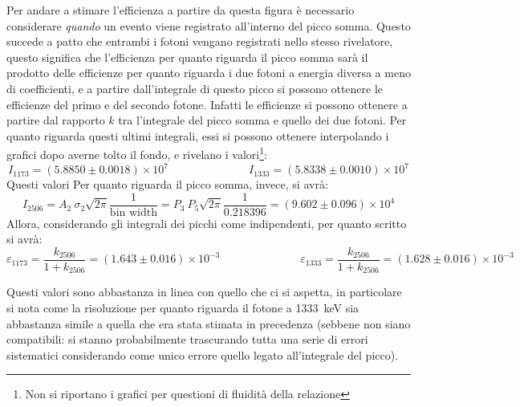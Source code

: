 Per andare a stimare l'efficienza a partire da questa figura è necessario considerare \textit{quando} un evento viene registrato all'interno del picco somma. Questo succede
a patto che entrambi i fotoni vengano registrati nello stesso rivelatore, questo significa che l'efficienza per quanto riguarda il picco somma sarà il prodotto delle efficienze
per quanto riguarda i due fotoni a energia diversa a meno di coefficienti, e a partire dall'integrale di questo picco si possono ottenere le efficienze del primo e del secondo fotone. Infatti le
efficienze si possono ottenere a partire dal rapporto $k$ tra l'integrale del picco somma e quello dei due fotoni. Per quanto riguarda questi ultimi integrali, essi si possono ottenere
interpolando i grafici dopo averne tolto il fondo, e rivelano i valori\footnote{Non si riportano i grafici per questioni di fluidità della relazione}:
$$I_{1173} = (5.8850 \pm 0.0018)\times 10^7 \hspace{3cm} I_{1333} = (5.8338 \pm 0.0010)\times 10^7$$
Questi valori
Per quanto riguarda il picco somma, invece, si avrà:
$$I_{2506} = A_2\ \sigma_2\sqrt{2\pi}\frac{1}{\text{bin width}} = P_3\ P_5 \sqrt{2\pi}\frac{1}{0.218396} = (9.602 \pm 0.096)\times 10^4$$
Allora, considerando gli integrali dei picchi come indipendenti, per quanto scritto si avrà:
$$\varepsilon_{1173}=\frac{k_{2506}}{1+k_{2506}}=(1.643 \pm 0.016)\times 10^{-3} \hspace{3cm} \varepsilon_{1333}=\frac{k_{2506}}{1+k_{2506}}=(1.628 \pm 0.016)\times 10^{-3}$$

Questi valori sono abbastanza in linea con quello che ci si aspetta, in particolare si nota come la risoluzione per quanto riguarda il fotone a 1333~keV sia abbastanza
simile a quella che era stata stimata in precedenza (sebbene non siano compatibili: si stanno probabilmente trascurando tutta una serie di errori sistematici considerando
come unico errore quello legato all'integrale del picco).\\

